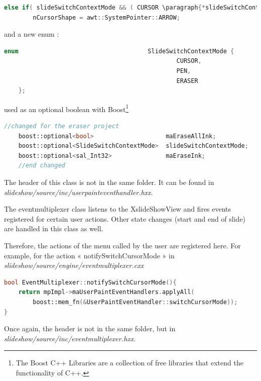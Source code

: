 \documentclass[a4paper,11pt]{article}
\begin{document}
\begin{lstlisting}[language=C++]
    else if( slideSwitchContextMode && ( CURSOR \paragraph{*slideSwitchContextMode ))
        nCursorShape = awt::SystemPointer::ARROW;
\end{lstlisting}

and a new enum :

\begin{lstlisting}[language=C++]
    enum                                    SlideSwitchContextMode {
                                                CURSOR,
                                                PEN,
                                                ERASER
    };
\end{lstlisting}

used as an optional boolean with Boost\footnote{The Boost C++ Libraries are a
collection of free libraries that extend the functionality of C++.}

\begin{lstlisting}[language=C++]
    //changed for the eraser project
    boost::optional<bool>                    maEraseAllInk;
    boost::optional<SlideSwitchContextMode>  slideSwitchContextMode;
    boost::optional<sal_Int32>               maEraseInk;
    //end changed
\end{lstlisting}

The header of this class is not in the same folder. It can be found in
\emph{slideshow/source/inc/userpainteventhandler.hxx}.


The eventmultiplexer class listens to the XslideShowView and fires events
registered for certain user actions. Other state changes (start and end of
slide) are handled in this class as well.

Therefore, the actions of the menu called by the user are registered here. For
example, for the action « notifySwitchCursorMode » in
\emph{slideshow/source/engine/eventmultiplexer.cxx}

\begin{lstlisting}[language=C++]
bool EventMultiplexer::notifySwitchCursorMode(){
    return mpImpl->maUserPaintEventHandlers.applyAll(
	    boost::mem_fn(&UserPaintEventHandler::switchCursorMode));
}
\end{lstlisting}

Once again, the header is not in the same folder, but in
\emph{slideshow/source/inc/eventmultiplexer.hxx}.
\end{document}
